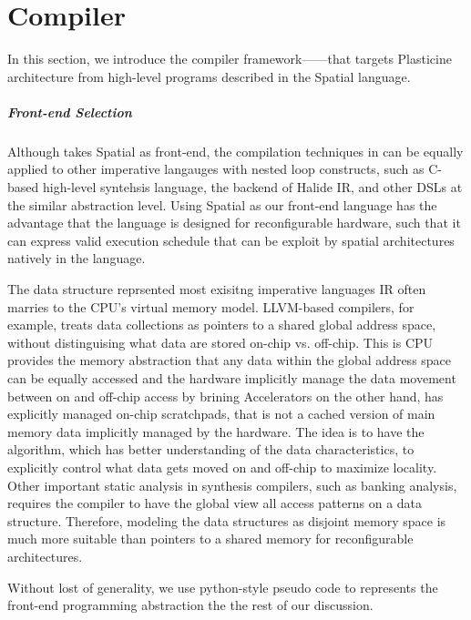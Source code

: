 \chapter{Compiler} \label{sec:compiler}

In this section, we introduce the compiler framework---\name---that targets Plasticine
architecture from high-level programs described in the Spatial language. 

 
\paragraph{Front-end Selection} 
Although \name takes Spatial as front-end, the compilation techniques in \name can be equally
applied to other imperative langauges with nested loop constructs, such as C-based high-level
syntehsis language, the backend of Halide IR, and other DSLs at the similar abstraction level. 
Using Spatial as our front-end language has the advantage that the language is designed for
reconfigurable hardware, such that it can express valid execution schedule that can be exploit by
spatial architectures natively in the language.

The data structure reprsented most exisitng imperative languages IR often marries to the
CPU's virtual memory model. LLVM-based compilers, for example, treats data collections as pointers to a shared
global address space, without distinguising what data are stored on-chip vs. off-chip.
This is CPU provides the memory abstraction that any data within the global address space 
can be equally accessed and the hardware implicitly manage the data movement between on and off-chip 
access by brining
Accelerators on the other hand, has explicitly managed on-chip scratchpads, that is not a cached
version of main memory data implicitly managed by the hardware.
The idea is to have the algorithm, which has better understanding of the data characteristics, to
explicitly control what data gets moved on and off-chip to maximize locality.
Other important static analysis in synthesis compilers, such as banking analysis, requires the
compiler to have the global view all access patterns on a data structure.
Therefore, modeling the data structures as disjoint memory space is much more suitable 
than pointers to a shared memory for reconfigurable architectures.

Without lost of generality, we use python-style pseudo code to represents the front-end programming
abstraction the the rest of our discussion.

